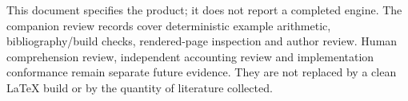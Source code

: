 This document specifies the product; it does not report a completed engine.
The companion review records cover deterministic example arithmetic,
bibliography/build checks, rendered-page inspection and author review. Human
comprehension review, independent accounting review and implementation
conformance remain separate future evidence. They are not replaced by a clean
LaTeX build or by the quantity of literature collected.
